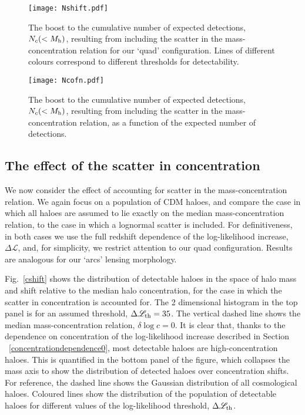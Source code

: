 \documentclass[a4paper, fleqn, usenatbib, useAMS]{mnras}
\def\DL{\Delta\mathscr{L}}
\begin{document}
\begin{figure}
\centering
\texttt{[image: Nshift.pdf]}
\caption{The boost to the cumulative number of expected detections, $N_c(<M_{\rm h})$, resulting 
from  including the scatter in the mass-concentration relation for our `quad' configuration. 
Lines of different colours correspond to different thresholds for detectability. }
\label{Nshift}
\end{figure}
\begin{figure}
\centering
\texttt{[image: Ncofn.pdf]}
\caption{The boost to the cumulative number of expected detections, $N_c(<M_{\rm h})$, resulting 
  from including the scatter in the mass-concentration relation, as a function of the 
expected number of detections.}
\label{Ncofn}
\end{figure}


\subsection{The effect of the scatter in concentration}
\label{concentrationdependence1}

We now consider the effect of accounting for scatter in the mass-concentration relation. 
We again focus on a population of CDM haloes, and compare the case in which all haloes 
are assumed to lie exactly on the median mass-concentration relation, to the case in which a lognormal 
scatter is included. For definitiveness, in both cases we use the full redshift dependence of the 
log-likelihood increase, $\DL$, and, for simplicity, we restrict
attention to our quad configuration. 
Results are analogous for our `arcs' lensing morphology.

Fig.~\ref{cshift} shows the distribution of detectable haloes in the space of halo mass
and shift relative to the median halo concentration, for the case in which the scatter in concentration is accounted for. 
The 2 dimensional histogram in the top panel is for an assumed
threshold, $\DL_{\rm th}=35$. The vertical 
dashed line shows the median mass-concentration relation, $\delta\log c=0$. It is clear that,
thanks to the dependence on concentration of the log-likelihood increase described in 
Section ~\ref{concentrationdependence0}, most detectable haloes are high-concentration haloes. 
This is quantified in the bottom panel of the figure, which collapses the mass axis to show 
the distribution of detected haloes over concentration shifts. For reference, the dashed line 
shows the Gaussian distribution of all cosmological haloes. Coloured lines show the distribution of
the population of detectable haloes for different values of the
log-likelihood threshold,  $\DL_{\rm th}$. 
\end{document}
